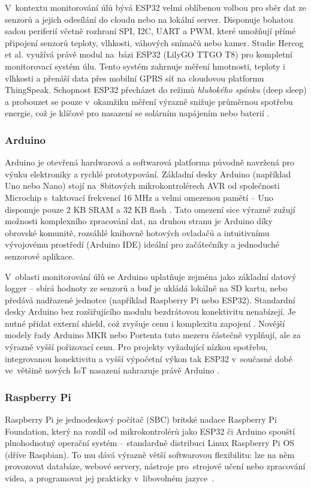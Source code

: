 V~kontextu monitorování úlů bývá ESP32 velmi oblíbenou volbou pro sběr dat ze senzorů a jejich odesílání do cloudu nebo na lokální server. Disponuje bohatou sadou periferií včetně rozhraní SPI, I2C, UART a PWM, které umožňují přímé připojení senzorů teploty, vlhkosti, váhových snímačů nebo kamer. Studie Hercog et al. \cite{Hercog2023} využívá právě modul na~bázi ESP32 (LilyGO TTGO T8) pro kompletní monitorovací systém úlu. Tento systém zahrnuje měření hmotnosti, teploty i vlhkosti a přenáší data přes mobilní GPRS síť na cloudovou platformu ThingSpeak. Schopnost ESP32 přecházet do režimů \textit{hlubokého spánku} (deep sleep) a probouzet se pouze v~okamžiku měření výrazně snižuje průměrnou spotřebu energie, což je klíčové pro nasazení se solárním napájením nebo baterií \cite{PCBSync}.

\subsubsection*{Arduino}
Arduino je otevřená hardwarová a softwarová platforma původně navržená pro výuku elektroniky a rychlé prototypování. Základní desky Arduino (například Uno nebo Nano) stojí na~8bitových mikrokontrolérech AVR od společnosti Microchip s~taktovací frekvencí 16 MHz a velmi omezenou pamětí -- Uno disponuje pouze 2 KB SRAM a 32 KB flash \cite{ArduinoUno}. Tato omezení sice výrazně zužují možnosti komplexního zpracování dat, na druhou stranu je Arduino díky obrovské komunitě, rozsáhlé knihovně hotových ovladačů a intuitivnímu vývojovému prostředí (Arduino IDE) ideální pro začátečníky a jednoduché senzorové aplikace.

V~oblasti monitorování úlů se Arduino uplatňuje zejména jako základní datový logger -- sbírá hodnoty ze senzorů a buď je ukládá lokálně na SD kartu, nebo předává nadřazené jednotce (například Raspberry Pi nebo ESP32). Standardní desky Arduino bez rozšiřujícího modulu bezdrátovou konektivitu nenabízejí. Je nutné přidat externí shield, což zvyšuje cenu i komplexitu zapojení \cite{ArduinoUno}. Novější modely řady Arduino MKR nebo Portenta tuto mezeru částečně vyplňují, ale za výrazně vyšší pořizovací cenu. Pro projekty vyžadující nízkou spotřebu, integrovanou konektivitu a vyšší výpočetní výkon tak ESP32 v~současné době ve~většině nových IoT nasazení nahrazuje právě Arduino \cite{PCBSync}.

\subsubsection*{Raspberry Pi}
Raspberry Pi je jednodeskový počítač (SBC) britské nadace Raspberry Pi Foundation, který na rozdíl od mikrokontrolérů jako ESP32 či Arduino spouští plnohodnotný operační systém -- standardně distribuci Linux Raspberry Pi OS (dříve Raspbian). To mu dává výrazně větší softwarovou flexibilitu: lze na něm provozovat databáze, webové servery, nástroje pro~strojové učení nebo zpracování videa, a programovat jej prakticky v~libovolném jazyce~\cite{RPiDoc}. 

